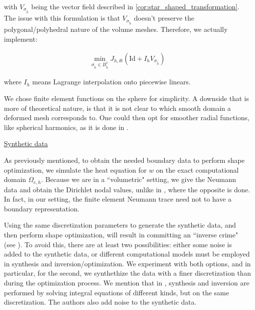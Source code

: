 \documentclass[english,a4paper,9pt,oneside]{scrbook}	%
\theoremstyle{break}
\theoremstyle{remark}
\newcommand{\id}{\text{Id}}
\begin{document}
with $V_{\sigma_{\tilde{h}}}$ being the vector field described in  \cref{cor:star_shaped_transformation}. The issue with this formulation is that  $V_{\sigma_{\tilde{h}}}$ doesn't preserve the polygonal/polyhedral nature of the volume meshes. Therefore, we actually implement:

\begin{align*}
	\min_{\sigma_{\tilde{h}} \in B^1_{\tilde{h}}}J_{h,\delta t }(\id  + I_h V_{\sigma_{\tilde{h}}})
\end{align*}

where $I_h$ means Lagrange interpolation onto piecewise linears.

We chose finite element functions on the sphere for simplicity. A downside that is more of theoretical nature, is that it is not clear to which smooth domain a deformed mesh corresponds to. One could then opt for smoother radial functions, like spherical harmonics, as it is done in \cite{harbrecht}.


\underline{Synthetic data}

As previously mentioned, to obtain the needed boundary data to perform shape optimization, we simulate the heat equation for $w$ on the exact computational domain $\Omega_{e,h}$. Because we are in a ``volumetric" setting, we give the Neumann data and obtain the Dirichlet nodal values, unlike in \cite{harbrecht}, where the opposite is done. In fact, in our setting, the finite element Neumann trace need not to have a boundary representation.

Using the same discretization parameters to generate the synthetic data, and then perform shape optimization, will result in committing an ``inverse crime" (see \cite{wirgin}). To avoid this, there are at least two possibilities: either some noise is added to the synthetic data, or different computational models must be employed in synthesis and inversion/optimization. We experiment with both options, and in particular, for the second, we synthethize the data with a finer discretization than during the optimization process. We mention that in \cite{harbrecht}, synthesis and inversion are performed by solving integral equations of different kinds, but on the same discretization. The authors also add noise to the synthetic data.  
\end{document}
